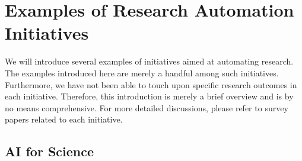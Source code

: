 

\section{Examples of Research Automation Initiatives}
We will introduce several examples of initiatives aimed at automating research. The examples introduced here are merely a handful among such initiatives. Furthermore, we have not been able to touch upon specific research outcomes in each initiative. Therefore, this introduction is merely a brief overview and is by no means comprehensive. For more detailed discussions, please refer to survey papers related to each initiative.


\subsection{AI for Science}

